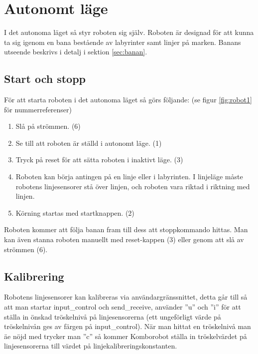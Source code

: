 
%
%

\section{Autonomt läge}
I det autonoma läget så styr roboten sig själv. Roboten är designad för att kunna ta sig igenom en bana bestående av labyrinter samt linjer på marken. Banans utseende beskrivs i detalj i sektion \ref{sec:banan}.

\subsection{Start och stopp}
För att starta roboten i det autonoma läget så görs följande: (se figur \ref{fig:robot1} för nummerreferenser)

\begin{enumerate}
\item Slå på strömmen. (6)
\item Se till att roboten är ställd i autonomt läge. (1)
\item Tryck på reset för att sätta roboten i inaktivt läge. (3)
\item Roboten kan börja antingen på en linje eller i labyrinten. I linjeläge måste robotens linjesensorer stå över linjen, och roboten vara riktad i riktning med linjen. 
\item Körning startas med startknappen. (2)
\end{enumerate}

Roboten kommer att följa banan fram till dess att stoppkommando hittas. Man kan även stanna roboten manuellt med reset-kappen (3) eller genom att slå av strömmen (6). 

\subsection{Kalibrering}
Robotens linjesensorer kan kalibreras via användargränssnittet, detta går till
så att man startar input\_control och send\_receive, använder ''u'' och ''i''
för att ställa in önskad tröskelnivå på linjesensorerna (ett ungeförligt värde
på tröskelnivån ges av färgen på input\_control). När man hittat en tröskelnivå
man äe nöjd med trycker man ''c'' så kommer Komborobot ställa in tröskelvärdet
på linjesensorerna till värdet på linjekalibreringskonstanten.

